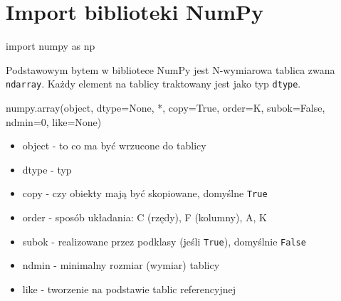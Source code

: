 \documentclass[
  letterpaper,
  DIV=11,
  numbers=noendperiod]{scrreprt}
\newenvironment{Shaded}{\begin{snugshade}}{\end{snugshade}}
\newcommand{\BuiltInTok}[1]{\textcolor[rgb]{0.00,0.23,0.31}{#1}}
\newcommand{\DecValTok}[1]{\textcolor[rgb]{0.68,0.00,0.00}{#1}}
\newcommand{\ImportTok}[1]{\textcolor[rgb]{0.00,0.46,0.62}{#1}}
\newcommand{\NormalTok}[1]{\textcolor[rgb]{0.00,0.23,0.31}{#1}}
\newcommand{\OperatorTok}[1]{\textcolor[rgb]{0.37,0.37,0.37}{#1}}
\newcommand{\StringTok}[1]{\textcolor[rgb]{0.13,0.47,0.30}{#1}}
\newcommand{\VariableTok}[1]{\textcolor[rgb]{0.07,0.07,0.07}{#1}}
\providecommand{\tightlist}{%
  \setlength{\itemsep}{0pt}\setlength{\parskip}{0pt}}\usepackage{longtable,booktabs,array}
\begin{document}
\section{Import biblioteki NumPy}\label{import-biblioteki-numpy}

\begin{Shaded}
\begin{Highlighting}[]
\ImportTok{import}\NormalTok{ numpy }\ImportTok{as}\NormalTok{ np}
\end{Highlighting}
\end{Shaded}

Podstawowym bytem w bibliotece NumPy jest N-wymiarowa tablica zwana
\texttt{ndarray}. Każdy element na tablicy traktowany jest jako typ
\texttt{dtype}.

\begin{Shaded}
\begin{Highlighting}[]
\NormalTok{numpy.array(}\BuiltInTok{object}\NormalTok{, dtype}\OperatorTok{=}\VariableTok{None}\NormalTok{, }\OperatorTok{*}\NormalTok{, copy}\OperatorTok{=}\VariableTok{True}\NormalTok{, order}\OperatorTok{=}\StringTok{\textquotesingle{}K\textquotesingle{}}\NormalTok{, subok}\OperatorTok{=}\VariableTok{False}\NormalTok{, ndmin}\OperatorTok{=}\DecValTok{0}\NormalTok{, like}\OperatorTok{=}\VariableTok{None}\NormalTok{)}
\end{Highlighting}
\end{Shaded}

\begin{itemize}
\tightlist
\item
  object - to co ma być wrzucone do tablicy
\item
  dtype - typ
\item
  copy - czy obiekty mają być skopiowane, domyślne \texttt{True}
\item
  order - sposób układania: C (rzędy), F (kolumny), A, K
\item
  subok - realizowane przez podklasy (jeśli \texttt{True}), domyślnie
  \texttt{False}
\item
  ndmin - minimalny rozmiar (wymiar) tablicy
\item
  like - tworzenie na podstawie tablic referencyjnej
\end{itemize}
\end{document}
